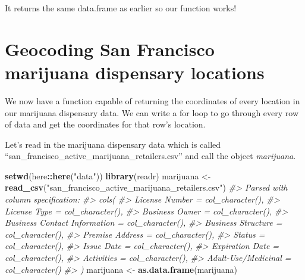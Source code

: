 \documentclass[
  12pt,
]{book}
\newenvironment{Shaded}{\begin{snugshade}}{\end{snugshade}}
\newcommand{\CommentTok}[1]{\textcolor[rgb]{0.37,0.37,0.37}{\textit{#1}}}
\newcommand{\KeywordTok}[1]{\textcolor[rgb]{0.27,0.27,0.27}{\textbf{#1}}}
\newcommand{\NormalTok}[1]{#1}
\newcommand{\OperatorTok}[1]{\textcolor[rgb]{0.43,0.43,0.43}{\textbf{#1}}}
\newcommand{\StringTok}[1]{\textcolor[rgb]{0.5,0.5,0.5}{#1}}
\begin{document}
It returns the same data.frame as earlier so our function works!

\hypertarget{geocoding-san-francisco-marijuana-dispensary-locations}{%
\section{Geocoding San Francisco marijuana dispensary locations}\label{geocoding-san-francisco-marijuana-dispensary-locations}}

We now have a function capable of returning the coordinates of every location in our marijuana dispensary data. We can write a for loop to go through every row of data and get the coordinates for that row's location.

Let's read in the marijuana dispensary data which is called ``san\_francisco\_active\_marijuana\_retailers.csv'' and call the object \emph{marijuana}.

\begin{Shaded}
\begin{Highlighting}[]
\KeywordTok{setwd}\NormalTok{(here}\OperatorTok{::}\KeywordTok{here}\NormalTok{(}\StringTok{"data"}\NormalTok{))}
\KeywordTok{library}\NormalTok{(readr)}
\NormalTok{marijuana <{-}}\StringTok{ }\KeywordTok{read\_csv}\NormalTok{(}\StringTok{"san\_francisco\_active\_marijuana\_retailers.csv"}\NormalTok{)}
\CommentTok{\#> Parsed with column specification:}
\CommentTok{\#> cols(}
\CommentTok{\#>   \textasciigrave{}License Number\textasciigrave{} = col\_character(),}
\CommentTok{\#>   \textasciigrave{}License Type\textasciigrave{} = col\_character(),}
\CommentTok{\#>   \textasciigrave{}Business Owner\textasciigrave{} = col\_character(),}
\CommentTok{\#>   \textasciigrave{}Business Contact Information\textasciigrave{} = col\_character(),}
\CommentTok{\#>   \textasciigrave{}Business Structure\textasciigrave{} = col\_character(),}
\CommentTok{\#>   \textasciigrave{}Premise Address\textasciigrave{} = col\_character(),}
\CommentTok{\#>   Status = col\_character(),}
\CommentTok{\#>   \textasciigrave{}Issue Date\textasciigrave{} = col\_character(),}
\CommentTok{\#>   \textasciigrave{}Expiration Date\textasciigrave{} = col\_character(),}
\CommentTok{\#>   Activities = col\_character(),}
\CommentTok{\#>   \textasciigrave{}Adult{-}Use/Medicinal\textasciigrave{} = col\_character()}
\CommentTok{\#> )}
\NormalTok{marijuana <{-}}\StringTok{ }\KeywordTok{as.data.frame}\NormalTok{(marijuana)}
\end{Highlighting}
\end{Shaded}
\end{document}
